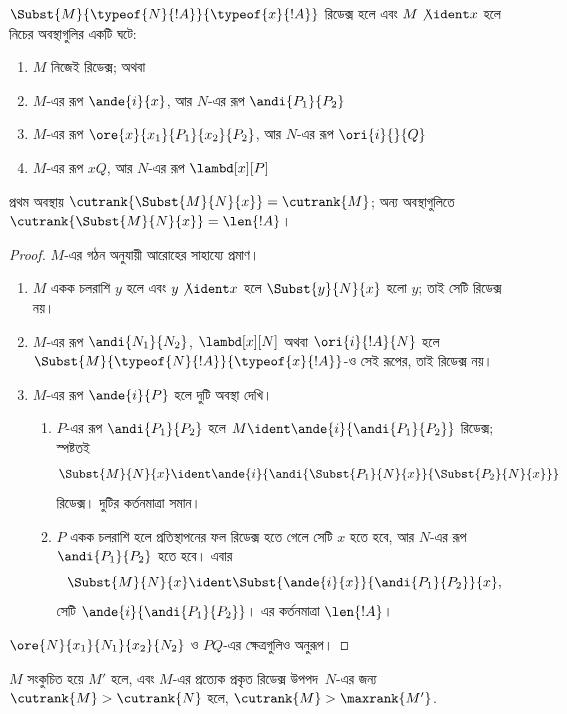 \documentclass[../../../include/open-logic-section]{subfiles}
\begin{document}
\begin{lem}
  $\Subst{M}{\typeof{N}{!A}}{\typeof{x}{!A}}$ রিডেক্স
  হলে এবং $M \not\ident x$ হলে নিচের
  অবস্থাগুলির একটি ঘটে:
  \begin{enumerate}
  \item $M$ নিজেই রিডেক্স; অথবা
  \item $M$-এর রূপ $\ande{i}{x}$, আর $N$-এর রূপ
    $\andi{P_1}{P_2}$
  \item $M$-এর রূপ $\ore{x}{x_1}{P_1}{x_2}{P_2}$, আর $N$-এর
    রূপ $\ori{i}{}{Q}$
  \item $M$-এর রূপ $x Q$, আর $N$-এর রূপ
    $\lambd[x][P]$
  \end{enumerate}
  প্রথম অবস্থায় $\cutrank{\Subst{M}{N}{x}} = \cutrank{M}$;
  অন্য অবস্থাগুলিতে $\cutrank{\Subst{M}{N}{x}} = \len{!A}$।
\end{lem}
\begin{proof}
  $M$-এর গঠন অনুযায়ী আরোহের সাহায্যে প্রমাণ।
  \begin{enumerate}
  \item $M$ একক চলরাশি $y$ হলে এবং $y \not\ident x$ হলে
    $\Subst{y}{N}{x}$ হলো $y$; তাই সেটি রিডেক্স নয়।
  \item $M$-এর রূপ $\andi{N_1}{N_2}$,
    $\lambd[x][N]$ অথবা $\ori{i}{!A}{N}$ হলে
    $\Subst{M}{\typeof{N}{!A}}{\typeof{x}{!A}}$-ও
    সেই রূপের, তাই রিডেক্স নয়।
  \item $M$-এর রূপ $\ande{i}{P}$ হলে দুটি অবস্থা দেখি।
    \begin{enumerate}
      \item $P$-এর রূপ $\andi{P_1}{P_2}$ হলে $M \ident
        \ande{i}{\andi{P_1}{P_2}}$ রিডেক্স; স্পষ্টতই
        \[
        \Subst{M}{N}{x} \ident
        \ande{i}{\andi{\Subst{P_1}{N}{x}}{\Subst{P_2}{N}{x}}}
        \]
        রিডেক্স। দুটির কর্তনমাত্রা সমান।
      \item $P$ একক চলরাশি হলে প্রতিস্থাপনের ফল
        রিডেক্স হতে গেলে সেটি $x$ হতে হবে,
        আর $N$-এর রূপ $\andi{P_1}{P_2}$ হতে হবে। এবার
        \[
        \Subst{M}{N}{x} \ident \Subst{\ande{i}{x}}{\andi{P_1}{P_2}}{x},
        \]
        সেটি $\ande{i}{\andi{P_1}{P_2}}$। এর কর্তনমাত্রা
        $\len{!A}$।
    \end{enumerate}
  \end{enumerate}
  $\ore{N}{x_1}{N_1}{x_2}{N_2}$ ও $P Q$-এর
  ক্ষেত্রগুলিও অনুরূপ।
\end{proof}

\begin{lem}
  $M$ সংকুচিত হয়ে $M'$ হলে, এবং $M$-এর প্রত্যেক
  প্রকৃত রিডেক্স উপপদ~$N$-এর জন্য
  $\cutrank{M} > \cutrank{N}$ হলে, $\cutrank{M} >
  \maxrank{M'}$.
\end{lem}
\end{document}
